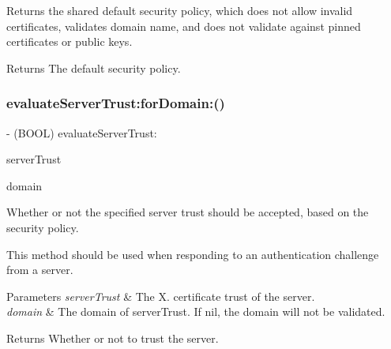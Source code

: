 Returns the shared default security policy, which does not allow invalid certificates, validates domain name, and does not validate against pinned certificates or public keys.

\begin{DoxyReturn}{Returns}
The default security policy. 
\end{DoxyReturn}
\mbox{\label{interface_m_q_t_t_s_s_l_security_policy_a1d6690010fc530144d98eaf31c9af7e4}} 
\subsubsection{\texorpdfstring{evaluate\+Server\+Trust\+:for\+Domain\+:()}{evaluateServerTrust:forDomain:()}}
{\footnotesize\ttfamily -\/ (B\+O\+OL) evaluate\+Server\+Trust\+: \begin{DoxyParamCaption}\item[{(Sec\+Trust\+Ref)}]{server\+Trust }\item[{forDomain:(N\+S\+String $\ast$)}]{domain }\end{DoxyParamCaption}}

Whether or not the specified server trust should be accepted, based on the security policy.

This method should be used when responding to an authentication challenge from a server.


\begin{DoxyParams}{Parameters}
{\em server\+Trust} & The X. certificate trust of the server. \\
\hline
{\em domain} & The domain of server\+Trust. If {\ttfamily nil}, the domain will not be validated.\\
\hline
\end{DoxyParams}
\begin{DoxyReturn}{Returns}
Whether or not to trust the server. 
\end{DoxyReturn}
\mbox{\label{interface_m_q_t_t_s_s_l_security_policy_a7d009f8f895d9305e5025bf37fda636d}} 
